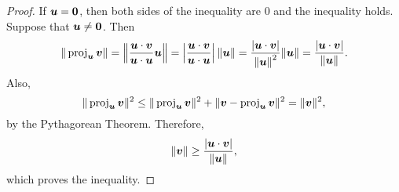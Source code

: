 {}
\begin{proof}
If $\boldsymbol u = \boldsymbol 0$, then both sides of the inequality are 0 and the inequality holds. Suppose that $\boldsymbol u\neq \boldsymbol 0$. Then 
\[\Vert \operatorname{proj}_{\boldsymbol u} \boldsymbol v\Vert = \left\Vert \dfrac{\boldsymbol u \cdot \boldsymbol v}{\boldsymbol u \cdot \boldsymbol u}\boldsymbol u\right\Vert = \left|\dfrac{\boldsymbol u\cdot \boldsymbol v}{\boldsymbol u \cdot \boldsymbol u }\right|\Vert \boldsymbol u \Vert =  \dfrac{|\boldsymbol u \cdot \boldsymbol v|}{\Vert{\boldsymbol u\Vert}^2} \Vert\boldsymbol u\Vert = \dfrac{|\boldsymbol u \cdot \boldsymbol v|}{\Vert \boldsymbol u \Vert}.\] Also,
\[\Vert \operatorname{proj}_{\boldsymbol u} \boldsymbol v\Vert^2 \le \Vert \operatorname{proj}_{\boldsymbol u} \boldsymbol v\Vert^2 + \Vert \boldsymbol v - \operatorname{proj}_{\boldsymbol u} \boldsymbol v\Vert^2 = \Vert \boldsymbol v\Vert^2,\] by the Pythagorean Theorem. Therefore, \[\Vert\boldsymbol v\Vert \ge \dfrac{|\boldsymbol u \cdot \boldsymbol v|}{\Vert \boldsymbol u \Vert},\] which proves the inequality.
\end{proof} \vs

